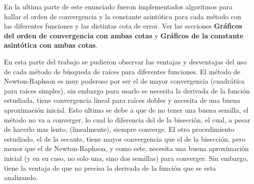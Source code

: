 \documentclass[titlepage,a4paper]{article}
\begin{document}
En la ultima parte de este enunciado fueron implementados algoritmos para hallar el orden de convergencia y la constante asintótica para cada método con las diferentes funciones y las distintas cota de error. Ver las secciones \textbf{Gráficos del orden de convergencia con ambas cotas} y \textbf{Gráficos de la constante asintótica con ambas cotas}.

En esta parte del trabajo se pudieron observar las ventajas y desventajas del uso de cada método de búsqueda de raíces para diferentes funciones. El método de Newton-Raphson es muy poderoso por ser el de mayor convergencia (cuadrática para raíces simples), sin embargo para usarlo se necesita la derivada de la función estudiada, tiene convergencia lineal para raíces dobles y necesita de una buena aproximación inicial. Esto ultimo se debe a que de no tener una buena semilla, el método no va a converger, lo cual lo diferencia del de la bisección, el cual, a pesar de hacerlo mas lento, (linealmente), siempre converge. El otro procedimiento estudiado, el de la secante, tiene mayor convergencia que el de la bisección, pero menor que el de Newton-Raphson, y como este, necesita una buena aproximación inicial (y en su caso, no solo una, sino dos semillas) para converger. Sin embargo, tiene la ventaja de que no precisa la derivada de la función que se esta analizando. 

\newpage
\end{document}
